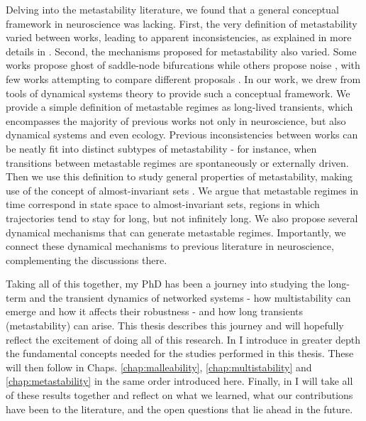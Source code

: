 Delving into the metastability literature, we found that a general conceptual framework in neuroscience was lacking. First, the very definition of metastability varied between works, leading to apparent inconsistencies, as explained in more details in . Second, the mechanisms proposed for metastability also varied. Some works propose ghost of saddle-node bifurcations \cite{tognoli2014metastable} while others propose noise \cite{brinkman2022metastable}, with few works attempting to compare different proposals \cite{graben2019metastable}. In our work, we drew from tools of dynamical systems theory to provide such a conceptual framework. We provide a simple definition of metastable regimes as long-lived transients, which encompasses the majority of previous works not only in neuroscience, but also dynamical systems and even ecology. Previous inconsistencies between works can be neatly fit into distinct subtypes of metastability - for instance, when transitions between metastable regimes are spontaneously or externally driven.
Then we use this definition to study general properties of metastability, making use of the concept of almost-invariant sets \cite{dellnitz2003congestion, froyland2005statistically}. We argue that metastable regimes in time correspond in state space to almost-invariant sets, regions in which trajectories tend to stay for long, but not infinitely long. We also propose several dynamical mechanisms that can generate metastable regimes. Importantly, we connect these dynamical mechanisms to previous literature in neuroscience, complementing the discussions there.   

Taking all of this together, my PhD has been a journey into studying the long-term and the transient dynamics of networked systems - how multistability can emerge and how it affects their robustness - and how long transients (metastability) can arise.  This thesis describes this journey and will hopefully reflect the excitement of doing all of this research. In  I introduce in greater depth the fundamental concepts needed for the studies performed in this thesis. These will then follow in Chaps. \ref{chap:malleability}, \ref{chap:multistability} and \ref{chap:metastability} in the same order introduced here. Finally, in  I will take all of these results together and reflect on what we learned, what our contributions have been to the literature, and the open questions that lie ahead in the future. 

